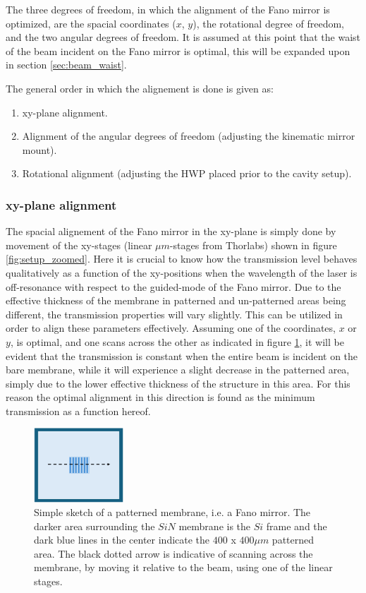 The three degrees of freedom, in which the alignment of the Fano mirror is optimized, are the spacial coordinates ($x$, $y$), the rotational degree of freedom, and the two angular degrees of freedom. It is assumed at this point that the waist of the beam incident on the Fano mirror is optimal, this will be expanded upon in section \ref{sec:beam_waist}.

The general order in which the alignement is done is given as:
\begin{enumerate}
    \item xy-plane alignment. 
    \item Alignment of the angular degrees of freedom (adjusting the kinematic mirror mount).
    \item Rotational alignment (adjusting the HWP placed prior to the cavity setup).
\end{enumerate}

\subsubsection*{xy-plane alignment}
The spacial alignement of the Fano mirror in the xy-plane is simply done by movement of the xy-stages (linear $\mu m$-stages from Thorlabs) shown in figure \ref{fig:setup_zoomed}. Here it is crucial to know how the transmission level behaves qualitatively as a function of the xy-positions when the wavelength of the laser is off-resonance with respect to the guided-mode of the Fano mirror. Due to the effective thickness of the membrane in patterned and un-patterned areas being different, the transmission properties will vary slightly. This can be utilized in order to align these parameters effectively. Assuming one of the coordinates, $x$ or $y$, is optimal, and one scans across the other as indicated in figure \ref{fig:xy_alignment_sketch}, it will be evident that the transmission is constant when the entire beam is incident on the bare membrane, while it will experience a slight decrease in the patterned area, simply due to the lower effective thickness of the structure in this area. For this reason the optimal alignment in this direction is found as the minimum transmission as a function hereof. 

\begin{figure}[h!]
    \centering 
    \includegraphics[width=0.3\textwidth]{figures/xy_alignment_sketch.pdf}
    \caption{Simple sketch of a patterned membrane, i.e. a Fano mirror. The darker area surrounding the $SiN$ membrane is the $Si$ frame and the dark blue lines in the center indicate the $400$ x $400 \mu m$ patterned area. The black dotted arrow is indicative of scanning across the membrane, by moving it relative to the beam, using one of the linear stages.}
    \label{fig:xy_alignment_sketch}
\end{figure}

